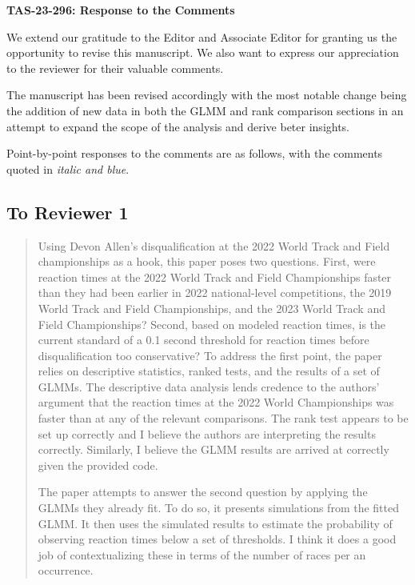 \documentclass[12pt]{article}
\newenvironment{comment}%
{\begin{quotation}\noindent\small\it\color{darkblue}\ignorespaces%
}{\end{quotation}}
\begin{document}
\begin{center}
  {\Large\bf TAS-23-296: Response to the Comments}
\end{center}

We extend our gratitude to the Editor and Associate Editor for 
granting us the opportunity to revise this manuscript. We also want to
express our appreciation to the reviewer for their valuable comments. 


The manuscript has been revised accordingly with the most notable change being 
the addition of new data in both the GLMM and rank comparison sections in an
attempt to expand the scope of the analysis and derive beter insights. 


Point-by-point responses to the comments are as follows, with the
comments quoted in \emph{\color{darkblue} italic and blue}.


\subsection*{To Reviewer 1}

\begin{comment}
Using Devon Allen's disqualification at the 2022 World Track and Field
championships as a hook, this paper poses two questions. First, were reaction
times at the 2022 World Track and Field Championships faster than they had been
earlier in 2022 national-level competitions, the 2019 World Track and Field
Championships, and the 2023 World Track and Field Championships? Second, based
on modeled reaction times, is the current standard of a 0.1 second threshold
for reaction times before disqualification too conservative? To
address the first point, the paper relies on descriptive statistics, ranked
tests, and the results of a set of GLMMs. The descriptive data analysis lends
credence to the authors' argument that the reaction times at the 2022 World
Championships was faster than at any of the relevant comparisons. The rank test
appears to be set up correctly and I believe the authors are interpreting the
results correctly. Similarly, I believe the GLMM results are arrived at
correctly given the provided code.

The paper attempts to answer the second question by applying the GLMMs they
already fit. To do so, it presents simulations from the fitted GLMM. It then
uses the simulated results to estimate the probability of observing reaction
times below a set of thresholds. I think it does a good job of contextualizing
these in terms of the number of races per an occurrence.
\end{comment}
\end{document}
